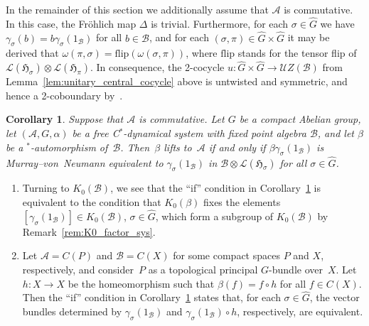 \documentclass[10pt,a4paper]{amsart}
\numberwithin{equation}{section}
\newtheorem{Corollary}[Theorem]{Corollary}
\newcommand*{\tensor}{\otimes}		%
\newcommand*{\Star}{$^*$\nobreakdash}
\newcommand*{\hilb}{\mathfrak}		%
\newcommand*{\alg}{\mathcal}		%
\newcommand*{\hH}{\hilb{H}}			%
\newcommand*{\one}{1}				%
\newcommand*{\aA}{\alg{A}}			%
\newcommand*{\aB}{\alg{B}} 			%
\newcommand*{\End}{\mathcal{L}} %
\newcommand*{\Cont}{C}
\begin{document}
In the remainder of this section we additionally assume that $\aA$ is commutative.
In this case, the Fr\"ohlich map $\Delta$ is trivial.
Furthermore, for each $\sigma \in \hat G$ we have $\gamma_\sigma(b) = b \gamma_\sigma(\one_\aB)$ for all $b \in \aB$, and for each $(\sigma,\pi) \in \hat G \times \hat G$ it may be derived that $\omega(\pi, \sigma) = \text{flip} ( \omega(\sigma,\pi) )$, where $\text{flip}$ stands for the tensor flip of $\End(\hH_\sigma) \tensor \End(\hH_\pi)$.
In consequence, the 2-cocycle $u\colon \hat G \times \hat G \to \mathcal{U}Z(\aB)$ from Lemma~\ref{lem:unitary_central_cocycle} above is untwisted and symmetric, and hence a 2-coboundary by~\cite[Lemma~3.6]{BCER84}.

\begin{Corollary}\label{cor:commAbelian}
	Suppose that $\aA$ is commutative. Let $G$ be a compact Abelian group, let $(\aA, G, \alpha)$ be a free C\Star-dynamical system with fixed point algebra $\aB$, and let $\beta$ be a \Star-automorphism of~$\aB$.
	Then~$\beta$ lifts to~$\aA$ if and only if $\beta\gamma_\sigma(\one_\aB)$ is Murray--von~Neumann equivalent to $\gamma_\sigma(\one_\aB)$ in \mbox{$\aB \tensor \End(\hH_\sigma)$} for all $\sigma \in \hat G$.
\end{Corollary}
\begin{Remark}\quad
	\begin{enumerate}\itemsep=0pt
	\item
		Turning to $K_0(\aB)$, we see that the ``if'' condition in Corollary~\ref{cor:commAbelian} is equivalent to the condition that $K_0(\beta)$ fixes the elements $[\gamma_\sigma(\one_\aB)] \in K_0(\aB)$, $\sigma \in \hat G$, which form a subgroup of $K_0(\aB)$ by Remark~\ref{rem:K0_factor_sys}.
	\item
	Let $\aA = \Cont(P)$ and $\aB = \Cont(X)$ for some compact spaces $P$ and $X$, respectively, and consider~$P$ as a topological principal $G$-bundle over~$X$.
Let $h\colon X \to X$ be the homeomorphism such that $\beta(f) = f \circ h$ for all $f \in \Cont(X)$.
Then the ``if'' condition in Corollary~\ref{cor:commAbelian} states that, for each $\sigma \in \hat G$, the vector bundles determined by $\gamma_\sigma(\one_\aB)$ and $\gamma_\sigma(\one_\aB) \circ h$, respectively, are equivalent.
	\end{enumerate}
\end{Remark}
\end{document}
